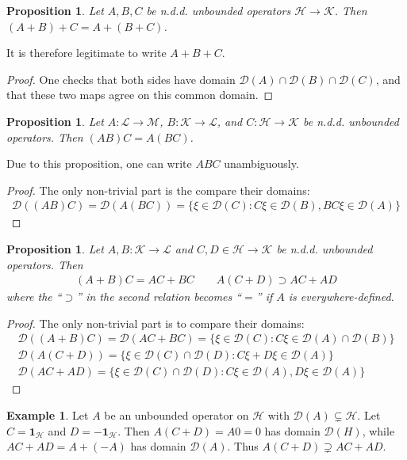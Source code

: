 \documentclass[12pt,b5paper,notitlepage]{article}
\theoremstyle{definition}
\newtheorem{eg}[df]{Example}
\theoremstyle{plain}
\newtheorem{pp}[df]{Proposition}
\newcommand{\idt}{\mathbf{1}}
\newcommand{\Dom}{\mathscr{D}}
\newcommand{\MH}{\mathcal H}
\newcommand{\MK}{\mathcal K}
\newcommand{\ML}{\mathcal L}
\newcommand{\MM}{\mathcal M}
\numberwithin{equation}{section}
\begin{document}
\begin{pp}
Let $A,B,C$ be n.d.d. unbounded operators $\MH\rightarrow\MK$. Then $(A+B)+C=A+(B+C)$.
\end{pp}


It is therefore legitimate to write $A+B+C$.

\begin{proof}
One checks that both sides have domain $\Dom(A)\cap\Dom(B)\cap\Dom(C)$, and that these two maps agree on this common domain.
\end{proof}



\begin{pp}\label{lb457}
Let $A:\ML\rightarrow\MM$, $B:\MK\rightarrow\ML$, and $C:\MH\rightarrow\MK$ be n.d.d. unbounded operators. Then $(AB)C=A(BC)$.
\end{pp}


Due to this proposition, one can write $ABC$ unambiguously.

\begin{proof}
The only non-trivial part is the compare their domains:
\begin{align*}
\Dom((AB)C)=\Dom(A(BC))=\{\xi\in\Dom(C):C\xi\in\Dom(B),BC\xi\in\Dom(A)\}
\end{align*}
\end{proof}


\begin{pp}\label{lb485}
Let $A,B:\MK\rightarrow\ML$ and $C,D\in\MH\rightarrow\MK$ be n.d.d. unbounded operators. Then
\begin{gather}
(A+B)C=AC+BC\qquad A(C+D)\supset AC+AD
\end{gather}
where the ``$\supset$'' in the second relation becomes ``$=$'' if $A$ is everywhere-defined.
\end{pp}



\begin{proof}
The only non-trivial part is to compare their domains:
\begin{gather*}
\Dom((A+B)C)=\Dom(AC+BC)=\{\xi\in\Dom(C):C\xi\in\Dom(A)\cap\Dom(B)\}\\
\Dom(A(C+D))=\{\xi\in\Dom(C)\cap\Dom(D):C\xi+D\xi\in\Dom(A)\}\\
\Dom(AC+AD)=\{\xi\in\Dom(C)\cap\Dom(D):C\xi\in\Dom(A),D\xi\in\Dom(A)\}
\end{gather*}
\end{proof}

\begin{eg}
Let $A$ be an unbounded operator on $\MH$ with $\Dom(A)\subsetneq\MH$. Let $C=\idt_\MH$ and $D=-\idt_\MH$. Then $A(C+D)=A0=0$ has domain $\Dom(H)$, while $AC+AD=A+(-A)$ has domain $\Dom(A)$. Thus $A(C+D)\supsetneq AC+AD$.
\end{eg}
\end{document}
